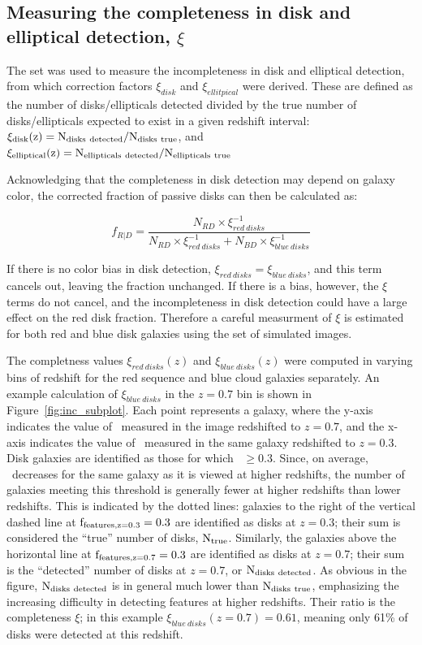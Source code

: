 \documentclass[useAMS,usenatbib]{mn2e}
\begin{document}
\subsection{Measuring the completeness in disk and elliptical detection, $\xi$}
\label{ssec:xi}

The  set was used to measure the incompleteness in disk and elliptical detection, from which correction factors $\xi_{disk}$ and $\xi_{ellitpical}$ were derived. These are defined as the number of disks/ellipticals detected divided by the true number of disks/ellipticals expected to exist in a given redshift interval: $\rm \xi_{disk}(z)=N_{disks~detected}/N_{\rm disks~true}$, and $\rm \xi_{elliptical}(z)=N_{ellipticals~detected}/N_{ellipticals~true}$


 Acknowledging that the completeness in disk detection may depend on galaxy color, the corrected fraction of passive disks can then be calculated as:

\begin{equation}
f_{R|D}=\frac{N_{RD}\times \xi^{-1}_{red~disks}}{N_{RD}\times \xi^{-1}_{red~disks} + N_{BD} \times \xi^{-1}_{blue~disks}}
\label{eqn:fdir}
\end{equation}

If there is no color bias in disk detection, $\xi_{red~disks}=\xi_{blue~disks}$, and this term cancels out, leaving the fraction unchanged. If there is a bias, however, the $\xi$ terms do not cancel, and the incompleteness in disk detection could have a large effect on the red disk fraction. Therefore a careful measurment of $\xi$ is estimated for both red and blue disk galaxies using the  set of simulated images. 

The completness values $\xi_{red~disks}(z)$ and $\xi_{blue~disks}(z)$ were computed in varying bins of redshift for the red sequence and blue cloud galaxies separately. An example calculation of $\xi_{blue~disks}$ in the $z=0.7$ bin is shown in Figure~\ref{fig:inc_subplot}. Each point represents a  galaxy, where the y-axis indicates the value of \ffeatures~measured in the image redshifted to $z=0.7$, and the x-axis indicates the value of \ffeatures~measured in the same galaxy redshifted to $z=0.3$. Disk galaxies are identified as those for which \ffeatures~$\ge0.3$. Since, on average, \ffeatures~decreases for the same galaxy as it is viewed at higher redshifts, the number of galaxies meeting this threshold is generally fewer at higher redshifts than lower redshifts. This is indicated by the dotted lines: galaxies to the right of the vertical dashed line at $\rm f_{features,z=0.3}=0.3$ are identified as disks at $z=0.3$; their sum is considered the ``true'' number of disks, $\rm N_{true}$. Similarly, the galaxies above the horizontal line at $\rm f_{features,z=0.7}=0.3$ are identified as disks at $z=0.7$; their sum is the ``detected'' number of disks at $z=0.7$, or $\rm N_{disks~detected}$. As obvious in the figure, $\rm N_{disks~detected}$ is in general much lower than $\rm N_{disks~true}$, emphasizing the increasing difficulty in detecting features at higher redshifts. Their ratio is the completeness $\xi$; in this example $\xi_{blue~disks}(z=0.7)=0.61$, meaning only 61\% of disks were detected at this redshift. 
\end{document}
